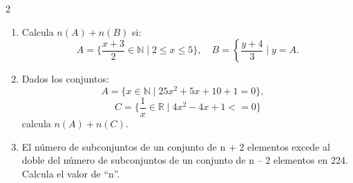 \documentclass[10pt]{article}
\begin{document}
\begin{multicols}{2}
\begin{enumerate}[label=\textbf{\arabic*.}, itemsep=0.4cm]
			\item Calcula $n(A) + n(B)$ si:
			\[
			A = \{ \frac{x+3}{2} \in \mathbb{N} \mid 2 \leq x \leq 5 \}, \quad B = \left\{ \frac{y+4}{3} \mid y = A.
			\]

			\item Dados los conjuntos:
			\[
			A = \{ x \in \mathbb{N} \mid 25x^2 + 5x + 10 + 1 = 0 \}, \quad
			\]
			\[
			C = \{ \frac{1}{x} \in \mathbb{R} \mid 4x^2 - 4x + 1<=  0 \}
			\]
			calcula $n(A) + n(C)$.

			\item El número de subconjuntos de un conjunto de
			n + 2 elementos excede al doble del número de
			subconjuntos de un conjunto de n – 2 elementos
			en 224. Calcula el valor de “n”.
		\end{enumerate}
	\end{multicols}
\end{document}
